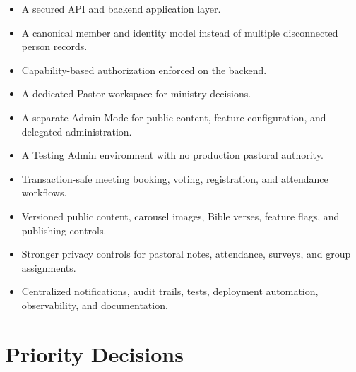 \documentclass[11pt,a4paper,oneside]{report}
\begin{document}
\begin{itemize}
  \item A secured API and backend application layer.
  \item A canonical member and identity model instead of multiple disconnected person records.
  \item Capability-based authorization enforced on the backend.
  \item A dedicated Pastor workspace for ministry decisions.
  \item A separate Admin Mode for public content, feature configuration, and delegated administration.
  \item A Testing Admin environment with no production pastoral authority.
  \item Transaction-safe meeting booking, voting, registration, and attendance workflows.
  \item Versioned public content, carousel images, Bible verses, feature flags, and publishing controls.
  \item Stronger privacy controls for pastoral notes, attendance, surveys, and group assignments.
  \item Centralized notifications, audit trails, tests, deployment automation, observability, and documentation.
\end{itemize}

\section{Priority Decisions}
\end{document}
